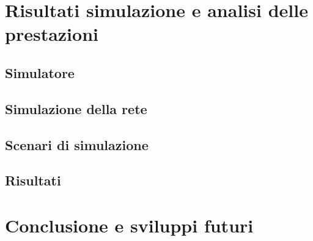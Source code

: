 \documentclass[12pt,a4paper,oneside]{book}
\begin{document}
		
	\chapter{Risultati simulazione e analisi delle prestazioni}
		
		\section{Simulatore}

		\section{Simulazione della rete}
			
		\section{Scenari di simulazione}
			
		\section{Risultati}
	
	\chapter{Conclusione e sviluppi futuri}
	
	
	
	
	
\end{document}
